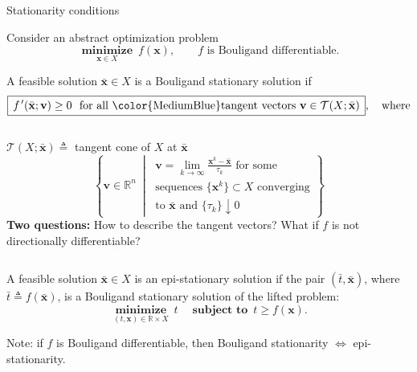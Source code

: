 \documentclass[aspectratio=169,xcolor=dvipsnames]{beamer}
\newcommand{\fp}{f\mkern2mu'}
\begin{document}
\begin{frame}{Stationarity conditions}
  \small
  \setlength{\abovedisplayskip}{3pt}
  \setlength{\belowdisplayskip}{3pt}

  Consider an abstract optimization problem
  \[
    \operatorname*{\textbf{minimize}}_{\mathbf{x}\in X}\ f(\mathbf{x}),
    \qquad f\text{ is Bouligand differentiable.}
  \]

  A feasible solution $\bar{\mathbf{x}}\in X$ is a
  {\color{MediumBlue}Bouligand stationary solution} if
  \[
    \boxed{\,\fp (\bar{\mathbf{x}};\mathbf{v})\geq 0\ \text{ for all
      {\color{MediumBlue}tangent vectors} }
      \mathbf{v}\in\mathcal{T}(X;\bar{\mathbf{x}})\,},\quad\text{where}
  \]

  \vspace{-0.06cm}
  \begin{columns}[T,onlytextwidth]
    {\color{MediumBlue}$\mathcal{T}(X;\bar{\mathbf{x}})\triangleq$} tangent
    cone of $X$ at $\bar{\mathbf{x}}$
    \[
      \left\{\mathbf{v}\in\mathbb{R}^n\ \middle|\
      \begin{array}{l}
        \mathbf{v}=\displaystyle\lim_{k\to\infty}
          \frac{\mathbf{x}^k-\bar{\mathbf{x}}}{\tau_k}
          \text{ for some}\\[6pt]
        \text{sequences }\{\mathbf{x}^k\}\subset X\text{ converging}\\[2pt]
        \text{to }\bar{\mathbf{x}}\text{ and }\{\tau_k\}\downarrow 0
      \end{array}\right\}
    \]
    \textcolor{MediumRed}{\textbf{Two questions:}} How to describe the
    tangent vectors? What if $f$ is not directionally differentiable?
  \end{columns}

  \vspace{0.04cm}
  A feasible solution $\bar{\mathbf{x}}\in X$ is an
  {\color{MediumBlue}epi-stationary solution} if the pair
  $(\bar{t},\bar{\mathbf{x}})$, where $\bar{t}\triangleq f(\bar{\mathbf{x}})$,
  is a Bouligand stationary solution of the lifted problem:
  \[
    \operatorname*{\textbf{minimize}}_{(t,\mathbf{x})\in\mathbb{R}\times X}\
    t\quad\operatorname*{\textbf{subject to}}\ t\geq f(\mathbf{x}).
  \]

  \textcolor{MediumRed}{Note:} if $f$ is Bouligand differentiable, then
  Bouligand stationarity $\Leftrightarrow$ epi-stationarity.
\end{frame}
\end{document}
